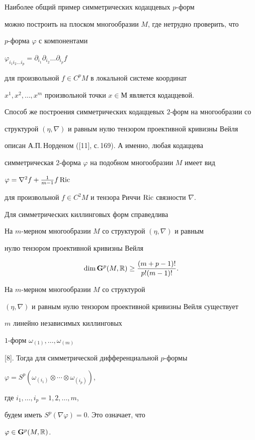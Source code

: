 Наиболее общий пример симметрических кодаццевых $p$-форм


можно построить на плоском многообразии $M$, где нетрудно проверить, что


$p$-форма $\varphi$ с компонентами


$\varphi_{i_1i_2\dotsc i_p}=


\partial_{i_1}\partial_{i_2} \dotsc \partial_{i_p} f$


для произвольной $f \in C^p M$ в локальной системе координат


$x^1,x^2,\dotsc,x^m$ произвольной точки $x \in М$ является кодаццевой.


Способ же построения симметрических кодаццевых $2$-форм на многообразии со


структурой $(\eta,\nabla)$ и равным нулю тензором проективной кривизны Вейля


описан А.П.\,Норденом ([11], с.\,169). А именно, любая кодаццева


симметрическая $2$-форма $\varphi$ на подобном многообразии $M$ имеет вид


$\varphi=\nabla^2 f+\frac{1}{m-1}f \operatorname{Ric}$


для произвольной $f\in C^2 M$ и тензора Риччи $\operatorname{Ric}$ связности $\nabla$.





Для симметрических киллинговых форм справедлива





\begin{thms}


На $m$-мерном многообразии $M$ со структурой $(\eta,\nabla)$ и равным


нулю тензором проективной кривизны Вейля


$$


\dim {\bold G}^p(M,\Bbb R)\ge \frac{(m+p-1)!}{p!(m-1)!}.


$$


\end{thms}





\begin{pf}


На $m$-мерном многообразии $M$ со структурой


$(\eta,\nabla)$ и равным нулю тензором проективной кривизны Вейля существует


$m$ линейно независимых киллинговых


$1$-форм $\omega_{(1)},\dotsc,\omega_{(m)}$


[8]. Тогда для симметрической дифференциальной $p$-формы


$\varphi=S^p(\omega_{(i_1)} \otimes \dotsb \otimes \omega_{(i_p)})$,


где $i_1,\dotsc ,i_p=1,2,\dotsc,m$,


будем иметь $S^p(\nabla\varphi)=0$. Это означает, что


$\varphi \in {\bold G}^p(M,\Bbb R)$.~\end{pf}





